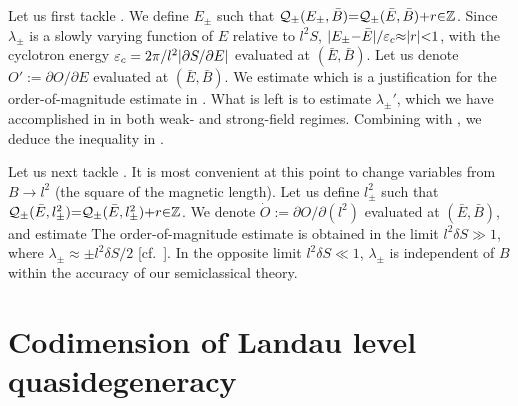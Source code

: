 \documentclass[aps, prb, showpacs, twocolumn, notitlepage, superscriptaddress]{revtex4-1}
\begin{document}
Let us first tackle . We define $E_{\pm}$ such that ${\cal Q}_{\pm}(E_{\pm},\bar{B}){=}{\cal Q}_{\pm}(\bar{E},\bar{B}){+}r{\in} \mathbb{Z}$. Since  $\lambda_{\pm}$ is a slowly varying function of $E$ relative to $l^2S$, $|E_{\pm}{-}\bar{E}|/\varepsilon_c{\approx} |r|{<}1$, with the cyclotron energy $\varepsilon_c=2\pi/l^2|\partial S/\partial E|$ evaluated at $(\bar{E},\bar{B})$. Let us denote $O':=\partial O/\partial E$ evaluated at $(\bar{E},\bar{B})$. We estimate
which is a justification for the order-of-magnitude estimate in .
What is left is to estimate $\lambda_{\pm}'$, which we have accomplished in  in both weak- and strong-field regimes. Combining   with , we deduce the inequality in .  

Let us next tackle . It is most convenient at this point to change variables from $B\rightarrow l^2$ (the square of the magnetic length). Let us  define   $l^2_{\pm}$ such that ${\cal Q}_{\pm}(\bar{E},l^2_{\pm}){=}{\cal Q}_{\pm}(\bar{E},l^2_{\pm}){+}r{\in} \mathbb{Z}$. We denote  $\dot{O}:=\partial O/\partial(l^2)$ evaluated at $(\bar{E},\bar{B})$, and estimate
The order-of-magnitude estimate is obtained in the limit $l^2\delta S \gg 1$, where $\lambda_{\pm}\approx \pm l^2\delta S/2$ [cf.\ ]. In the opposite limit $l^2\delta S \ll 1$, $\lambda_{\pm}$ is independent of $B$ within the accuracy of our semiclassical theory.    

\section{Codimension of Landau level quasidegeneracy}\label{app:codimension}
\end{document}
